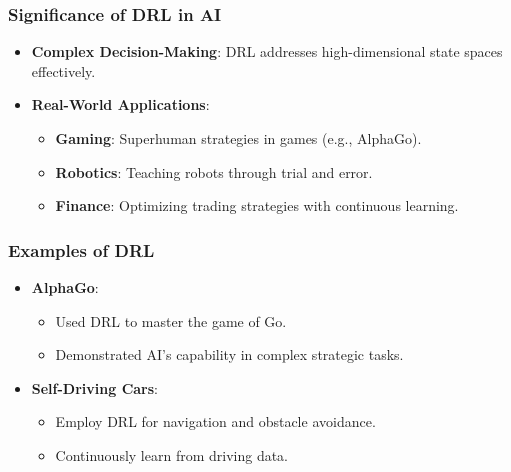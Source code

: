 \documentclass[aspectratio=169]{beamer}
\begin{document}
\begin{frame}[fragile]
    \frametitle{Significance of DRL in AI}
    
    \begin{itemize}
        \item \textbf{Complex Decision-Making}: DRL addresses high-dimensional state spaces effectively.
        \item \textbf{Real-World Applications}:
        \begin{itemize}
            \item \textbf{Gaming}: Superhuman strategies in games (e.g., AlphaGo).
            \item \textbf{Robotics}: Teaching robots through trial and error.
            \item \textbf{Finance}: Optimizing trading strategies with continuous learning.
        \end{itemize}
    \end{itemize}
    
\end{frame}

\begin{frame}[fragile]
    \frametitle{Examples of DRL}
    
    \begin{itemize}
        \item \textbf{AlphaGo}:
        \begin{itemize}
            \item Used DRL to master the game of Go.
            \item Demonstrated AI's capability in complex strategic tasks.
        \end{itemize}
        
        \item \textbf{Self-Driving Cars}:
        \begin{itemize}
            \item Employ DRL for navigation and obstacle avoidance.
            \item Continuously learn from driving data.
        \end{itemize}
    \end{itemize}

\end{frame}
\end{document}
